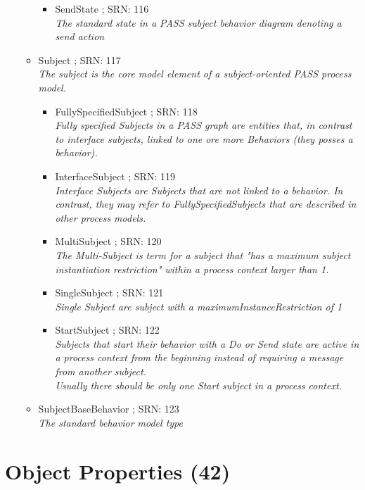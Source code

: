 \begin{itemize}
\begin{itemize}
\begin{itemize}
				\item SendState ; SRN: 116 \\ \textit{The standard state in a PASS subject behavior diagram denoting a send action}
			\end{itemize}
			\item Subject ; SRN: 117 \\ \textit{The subject is the core model element of a subject-oriented PASS process model.}
			\begin{itemize}
				\item FullySpecifiedSubject ; SRN: 118 \\ \textit{Fully specified Subjects in a PASS graph are entities that, in contrast to interface subjects, linked to one ore more Behaviors (they posses a behavior).}
				\item InterfaceSubject ; SRN: 119 \\ \textit{Interface Subjects are Subjects that are not linked to a behavior. In contrast, they may refer to FullySpecifiedSubjects that are described in other process models.}
				\item MultiSubject ; SRN: 120 \\ \textit{The Multi-Subject is term for a subject that "has a maximum subject instantiation restriction" within a process context larger than 1.}
				\item SingleSubject ; SRN: 121 \\ \textit{Single Subject are subject with a maximumInstanceRestriction of 1}
				\item StartSubject ; SRN: 122 \\ \textit{Subjects that start their behavior with a Do or Send state are active in a process context from the beginning instead of requiring a message from another subject.\\
					Usually there should be only one Start subject in a process context.}
			\end{itemize}
			\item SubjectBaseBehavior ; SRN: 123 \\ \textit{The standard behavior model type}
		\end{itemize}
	\end{itemize}	
	
	\normalsize
	
	\section{Object Properties (42)}
	

